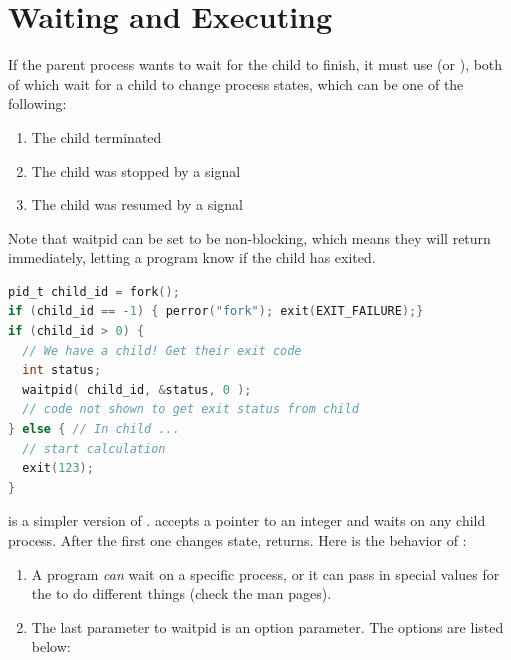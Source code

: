 \section{Waiting and Executing}

If the parent process wants to wait for the child to finish, it must use  (or ), both of which wait for a child to change process states, which can be one of the following:

\begin{enumerate}
\item The child terminated
\item The child was stopped by a signal
\item The child was resumed by a signal
\end{enumerate}

Note that waitpid can be set to be non-blocking, which means they will return immediately, letting a program know if the child has exited.

\begin{lstlisting}[language=C]
pid_t child_id = fork();
if (child_id == -1) { perror("fork"); exit(EXIT_FAILURE);}
if (child_id > 0) {
  // We have a child! Get their exit code
  int status;
  waitpid( child_id, &status, 0 );
  // code not shown to get exit status from child
} else { // In child ...
  // start calculation
  exit(123);
}
\end{lstlisting}

 is a simpler version of .
 accepts a pointer to an integer and waits on any child process.
After the first one changes state,  returns.
Here is the behavior of :

\begin{enumerate}
\item A program \emph{can} wait on a specific process, or it can pass in special values for the  to do different things (check the man pages).
\item The last parameter to waitpid is an option parameter.
The options are listed below:
\end{enumerate}

